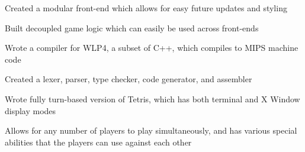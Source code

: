 \documentclass[]{deedy-resume-openfont}
\begin{document}
\begin{minipage}[t]{0.95\textwidth}
\begin{tightemize}
\item Created a modular front-end which allows for easy future updates and styling
\item Built decoupled game logic which can easily be used across front-ends
\end{tightemize}

\begin{tightemize}
\item Wrote a compiler for WLP4, a subset of C++, which compiles to MIPS machine code
\item Created a lexer, parser, type checker, code generator, and assembler
\end{tightemize}

\begin{tightemize}
\item Wrote fully turn-based version of Tetris, which has both terminal and X Window display modes
\item Allows for any number of players to play simultaneously, and has various special abilities that the players can use against each other
\end{tightemize}





\end{minipage}
\end{document}
